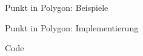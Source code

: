 \begin{frame}{Punkt in Polygon: Beispiele}
\begin{center}
	\end{center}
\end{frame}

\begin{frame}{Punkt in Polygon: Implementierung}
	\begin{exampleblock}{Code}
		\lstset{
			language=C++,
			tabsize=2
		}
		
	\end{exampleblock}
\end{frame}
